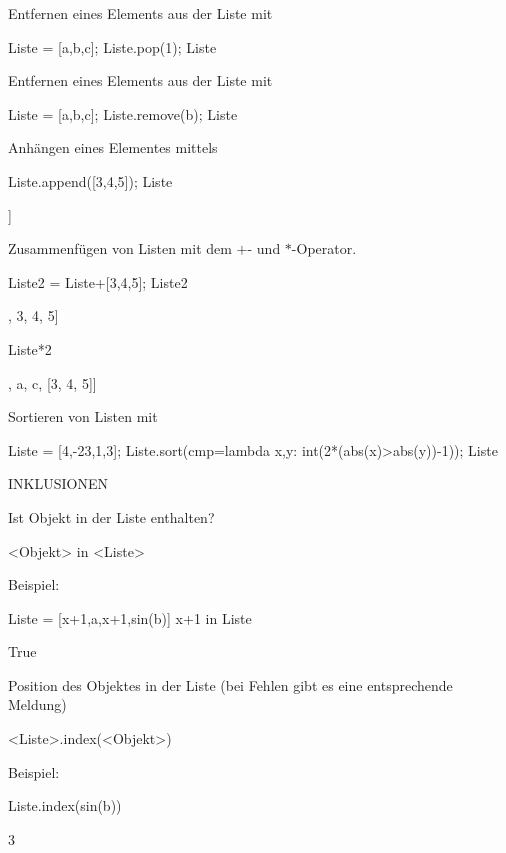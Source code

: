 \documentclass[fontsize=12pt,paper=a4,twoside,bibtotoc,idxtotoc,
liststotoc,pagesize,BCOR1.2cm,DIV15,chapterprefix,pagesize=pdftex]{scrbook}
\theoremstyle{plain}
\theoremstyle{definition}
\theoremstyle{remark}
\begin{document}
 Entfernen eines Elements aus der Liste mit 
\begin{sagein}
Liste = [a,b,c]; Liste.pop(1); Liste 
\end{sagein}
\begin{sage}
  [a, c]
\end{sage}
 Entfernen eines Elements aus der Liste mit  
\begin{sagein}
Liste = [a,b,c]; Liste.remove(b); Liste
\end{sagein}
\begin{sage}
  [a, c]
\end{sage}
 Anhängen eines Elementes mittels 
\begin{sagein}
Liste.append([3,4,5]); Liste
\end{sagein}
\begin{sage}
[a, c, [3, 4, 5]]
\end{sage}
 Zusammenfügen von Listen mit dem $+$- und $*$-Operator. 
\begin{sagein}
Liste2 = Liste+[3,4,5]; Liste2
\end{sagein}
\begin{sage}
[a, c, [3, 4, 5], 3, 4, 5]
\end{sage}
\begin{sagein}
Liste*2
\end{sagein}
\begin{sage}
 [a, c, [3, 4, 5], a, c, [3, 4, 5]]
\end{sage}
 Sortieren von Listen mit 
\begin{sagein}
Liste = [4,-23,1,3]; Liste.sort(cmp=lambda x,y: int(2*(abs(x)>abs(y))-1)); Liste
\end{sagein}
\begin{sage}
[1, 3, 4, -23]
\end{sage}


INKLUSIONEN


  Ist Objekt  in der Liste  enthalten?
\begin{sagein}
 <Objekt> in <Liste>
\end{sagein}
Beispiel:
\begin{sagein}
Liste = [x+1,a,x+1,sin(b)]
x+1 in Liste
\end{sagein}
\begin{sage}
  True
\end{sage}
 Position des Objektes in der Liste (bei Fehlen gibt es eine entsprechende Meldung)
\begin{sagein}
 <Liste>.index(<Objekt>)
\end{sagein}
Beispiel:
\begin{sagein}
Liste.index(sin(b))
\end{sagein}
\begin{sage}
  3
\end{sage}
\end{document}

